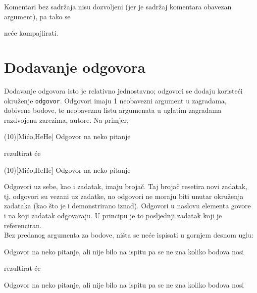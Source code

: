 \documentclass{studosi-workbook}
\begin{document}
	Komentari bez sadržaja nisu dozvoljeni (jer je sadržaj komentara obavezan argument), pa tako se
	
	\begin{kod}
	\komentar
	\end{kod}

	neće kompajlirati.
	
	
	\section{Dodavanje odgovora}
	Dodavanje odgovora isto je relativno jednostavno; odgovori se dodaju koristeći okruženje \texttt{odgovor}. Odgovori imaju 1 neobavezni argument u zagradama, dobivene bodove, te neobaveznu listu argumenata u uglatim zagradama razdvojenu zarezima, autore. Na primjer,
	
	\begin{kod}
	\begin{odgovor}(10)[Mićo,HeHe]
		Odgovor na neko pitanje
	\end{odgovor}
	\end{kod}

	rezultirat će
	
	\begin{odgovor}(10)[Mićo,HeHe]
		Odgovor na neko pitanje
	\end{odgovor}

	\vspace{25pt}
	
	Odgovori uz sebe, kao i zadatak, imaju brojač. Taj brojač resetira novi zadatak, tj. odgovori su vezani uz zadatke, no odgovori ne moraju biti unutar okruženja zadataka (kao što je i demonstrirano iznad). Odgovori u naslovu elementa govore i na koji zadatak odgovaraju. U principu je to posljednji zadatak koji je referenciran. \\
	
	Bez predanog argumenta za bodove, ništa se neće ispisati u gornjem desnom uglu:
	
	\begin{kod}
	\begin{odgovor}
		Odgovor na neko pitanje, ali nije bilo na ispitu pa se ne zna koliko bodova nosi
	\end{odgovor}
	\end{kod}
	
	rezultirat će
	
	\begin{odgovor}
		Odgovor na neko pitanje, ali nije bilo na ispitu pa se ne zna koliko bodova nosi
	\end{odgovor}
	\vspace*{25pt}
	
\end{document}
